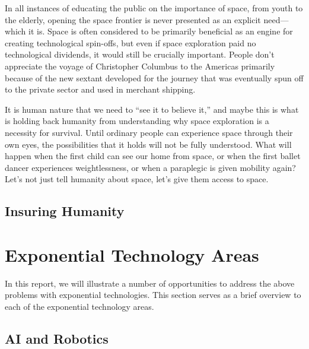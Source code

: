 \documentclass[letter,11pt]{article}
\begin{document}
In  all instances of educating the public on the importance of space, from  youth to the elderly, opening the space frontier is never presented as  an explicit need---which it is. Space is often considered to be  primarily beneficial as an engine for creating technological spin-offs,  but even if space exploration paid no technological dividends, it would  still be crucially important. People don't appreciate the voyage of  Christopher Columbus to the Americas primarily because of the new  sextant developed for the journey that was eventually spun off to the  private sector and used in merchant shipping.

It is human nature that we need to ``see it to believe it,'' and maybe this is what is holding back humanity  from understanding why space exploration is a necessity for survival.  Until ordinary people can experience space through their own eyes, the  possibilities that it holds will not be fully understood. What will  happen when the first child can see our home from space, or when the  first ballet dancer experiences weightlessness, or when a paraplegic is  given mobility again? Let's not just tell humanity about space, let's  give them access to space.


\subsection{Insuring Humanity}


\section{Exponential Technology Areas}

In this report, we will illustrate a number of opportunities to address the
above problems with exponential technologies. This section serves as a brief
overview to each of the exponential technology areas.

\subsection{AI and Robotics}

\end{document}
